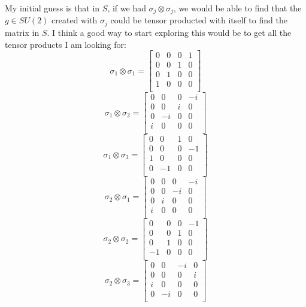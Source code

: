 \documentclass{article}
\begin{document}
My initial guess is that in $S$, if we had $\sigma_j \otimes \sigma_j$, we would be able to find that the $g \in SU(2)$ created with $\sigma_j$ could be tensor producted with itself to find the matrix in $S$. I think a good way to start exploring this would be to get all the tensor products I am looking for:
\[ \sigma_1 \otimes \sigma_1 = \left[
    \begin{array}{cccc}
    0 & 0 & 0 & 1 \\
    0 & 0 & 1 & 0 \\
    0 & 1 & 0 & 0 \\
    1 & 0 & 0 & 0 \\
    \end{array}
    \right] \]
\[ \sigma_1 \otimes \sigma_2 = \left[
    \begin{array}{cccc}
    0 & 0 & 0 & -\textit{i} \\
    0 & 0 & \textit{i} & 0 \\
    0 & -\textit{i} & 0 & 0 \\
    \textit{i} & 0 & 0 & 0 \\
    \end{array}
    \right] \]
\[ \sigma_1 \otimes \sigma_3 = \left[
    \begin{array}{cccc}
    0 & 0 & 1 & 0 \\
    0 & 0 & 0 & -1 \\
    1 & 0 & 0 & 0 \\
    0 & -1 & 0 & 0 \\
    \end{array}
    \right] \]
\[ \sigma_2 \otimes \sigma_1 = \left[
    \begin{array}{cccc}
    0 & 0 & 0 & -\textit{i} \\
    0 & 0 & -\textit{i} & 0 \\
    0 & \textit{i} & 0 & 0 \\
    \textit{i} & 0 & 0 & 0 \\
    \end{array}
    \right] \]
\[ \sigma_2 \otimes \sigma_2 = \left[
    \begin{array}{cccc}
    0 & 0 & 0 & -1 \\
    0 & 0 & 1 & 0 \\
    0 & 1 & 0 & 0 \\
    -1 & 0 & 0 & 0 \\
    \end{array}
    \right] \]
\[ \sigma_2 \otimes \sigma_3 = \left[
    \begin{array}{cccc}
    0 & 0 & -\textit{i} & 0 \\
    0 & 0 & 0 & \textit{i} \\
    \textit{i} & 0 & 0 & 0 \\
    0 & -\textit{i} & 0 & 0 \\
    \end{array}
    \right] \]
\end{document}
